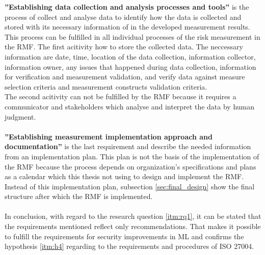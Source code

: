 \textbf{''Establishing data collection and analysis processes and tools''} is the process of collect and analyse data to identify how the data is collected and stored with its necessary information of in the developed measurement results. This process can be fulfilled in all individual processes of the risk measurement in the RMF. The first acitivity how to store the collected data. The neccessary information are date, time, location of the data collection, information collector, information owner, any issues that happened during data collection, information for verification and measurement validation, and verify data against measure selection criteria and measurement constructs validation criteria. \\ The second acitivity can not be fulfilled by the RMF because it requires a communicator and stakeholders which analyse and interpret the data by human judgment. \\ \\

\textbf{''Establishing measurement implementation approach and documentation''} is the last requirement and describe the needed information from an implementation plan. This plan is not the basis of the implementation of the RMF because the process depends on organization's specifications and plans as a calendar which this thesis not using to design and implement the RMF. Instead of this implementation plan, subsection \ref{sec:final_design} show the final structure after which the RMF is implemented. \\ \\

In conclusion, with regard to the research question \ref{itm:rq1}, it can be stated that the requirements mentioned reflect only recommendations. That makes it possible to fulfill the requirements for security improvements in ML and confirms the hypothesis \ref{itm:h4} regarding to the requirements and procedures of ISO 27004.

